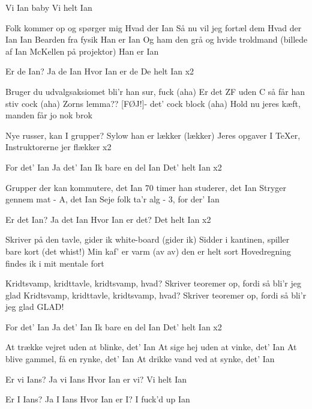 \documentclass[a4paper,11pt]{article}
\begin{document}
\begin{song}
 Vi Ian baby
Vi helt Ian

 Folk kommer op og spørger mig
Hvad der Ian
 Så nu vil jeg fortæl dem
Hvad der Ian
 Ian Bearden fra fysik
 Han er Ian
 Og ham den grå og hvide troldmand (billede af Ian McKellen
på projektor)
 Han er Ian

 Er de Ian?
 Ja de Ian
 Hvor Ian er de
 De helt Ian
x2

 Bruger du udvalgsaksiomet bli’r han sur, fuck (aha)
Er det ZF uden C så får han stiv cock (aha)
Zorns lemma?? [FØJ!]- det’ cock block (aha)
Hold nu jeres kæft, manden får jo nok brok

Nye russer, kan I grupper? Sylow han er lækker (lækker)
Jeres opgaver I TeXer, Instruktorerne jer flækker x2

 For det’ Ian
 Ja det’ Ian
 Ik bare en del Ian
 Det’ helt Ian
x2

 Grupper der kan kommutere, det Ian
 70 timer han studerer, det Ian
 Stryger gennem mat - A, det Ian
 Seje folk ta’r alg - 3, for der’ Ian

 Er det Ian?
 Ja det Ian
 Hvor Ian er det?
 Det helt Ian
x2

 Skriver på den tavle, gider ik white-board (gider ik)
Sidder i kantinen, spiller bare kort (det whist!)
Min kaf’ er varm (av av) den er helt sort
Hovedregning findes ik i mit mentale fort

 Kridtsvamp, kridttavle, kridtsvamp, hvad?
Skriver teoremer op, fordi så bli’r jeg glad
Kridtsvamp, kridttavle, kridtsvamp, hvad?
Skriver teoremer op, fordi så bli’r jeg glad
 GLAD!

 For det’ Ian
 Ja det’ Ian
 Ik bare en del Ian
 Det’ helt Ian
x2

 At trække vejret uden at blinke, det’ Ian
 At sige hej uden at vinke, det’ Ian
 At blive gammel, få en rynke, det’ Ian
 At drikke vand ved at synke, det’ Ian

 Er vi Ians?
 Ja vi Ians
 Hvor Ian er vi?
Vi helt Ian

 Er I Ians?
 Ja I Ians
 Hvor Ian er I?
 I fuck’d up Ian
\end{song}
\end{document}

